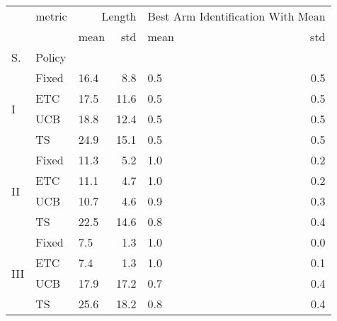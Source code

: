 \begin{tabular}{lllrlr}
\toprule
 & metric & \multicolumn{2}{r}{Length} & \multicolumn{2}{r}{Best Arm Identification With Mean} \\
 &  & mean & std & mean & std \\
S. & Policy &  &  &  &  \\
\midrule
\multirow[c]{4}{*}{I} & Fixed & 16.4 & 8.8 & 0.5 & 0.5 \\
 & ETC & 17.5 & 11.6 & 0.5 & 0.5 \\
 & UCB & 18.8 & 12.4 & 0.5 & 0.5 \\
 & TS & 24.9 & 15.1 & 0.5 & 0.5 \\
\multirow[c]{4}{*}{II} & Fixed & 11.3 & 5.2 & 1.0 & 0.2 \\
 & ETC & 11.1 & 4.7 & 1.0 & 0.2 \\
 & UCB & 10.7 & 4.6 & 0.9 & 0.3 \\
 & TS & 22.5 & 14.6 & 0.8 & 0.4 \\
\multirow[c]{4}{*}{III} & Fixed & 7.5 & 1.3 & 1.0 & 0.0 \\
 & ETC & 7.4 & 1.3 & 1.0 & 0.1 \\
 & UCB & 17.9 & 17.2 & 0.7 & 0.4 \\
 & TS & 25.6 & 18.2 & 0.8 & 0.4 \\
\bottomrule
\end{tabular}
